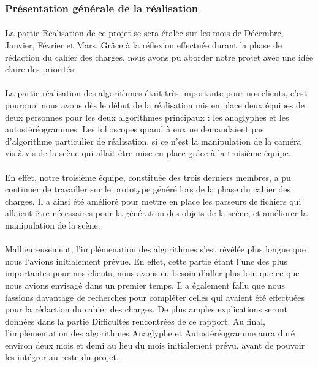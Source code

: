 \subsubsection{Présentation générale de la réalisation}
\paragraph{}
La partie Réalisation de ce projet se sera étalée sur les mois de Décembre, Janvier, Février et Mars. Grâce à la réflexion effectuée durant la phase de rédaction du cahier des charges, nous avons pu aborder notre projet avec une idée claire des priorités.

\paragraph{}
La partie réalisation des algorithmes était très importante pour nos clients, c'est pourquoi nous avons dès le début de la réalisation mis en place deux équipes de deux personnes pour les deux algorithmes principaux : les anaglyphes et les autostéréogrammes. Les folioscopes quand à eux ne demandaient pas d'algorithme particulier de réalisation, si ce n'est la manipulation de la caméra vis à vis de la scène qui allait être mise en place grâce à la troisième équipe.

\paragraph{}
En effet, notre troisième équipe, constituée des trois derniers membres, a pu continuer de travailler sur le prototype généré lors de la phase du cahier des charges. Il a ainsi été amélioré pour mettre en place les parseurs de fichiers qui allaient être nécessaires pour la génération des objets de la scène, et améliorer la manipulation de la scène.

\paragraph{}
Malheureusement, l'implémenation des algorithmes s'est révélée plus longue que nous l'avions initialement prévue. En effet, cette partie étant l'une des plus importantes pour nos clients, nous avons eu besoin d'aller plus loin que ce que nous avions envisagé dans un premier temps. Il a également fallu que nous fassions davantage de recherches pour compléter celles qui avaient été effectuées pour la rédaction du cahier des charges. De plus amples explications seront données dans la partie Difficultés rencontrées de ce rapport. 
Au final, l'implémentation des algorithmes Anaglyphe et Autostéréogramme aura duré environ deux mois et demi au lieu du mois initialement prévu, avant de pouvoir les intégrer au reste du projet.


